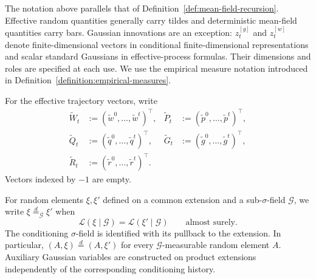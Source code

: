 The notation above parallels that of
Definition~\ref{def:mean-field-recursion}.
Effective random quantities generally carry tildes and
deterministic mean-field quantities carry bars.
Gaussian innovations are an exception: $z_t^{[g]}$ and
$z_t^{[w]}$ denote finite-dimensional vectors in conditional
finite-dimensional representations and scalar standard
Gaussians in effective-process formulas.
Their dimensions and roles are specified at each use.
We use the empirical measure notation introduced in
Definition~\ref{definition:empirical-measures}.

For the effective trajectory vectors, write
\[
\begin{aligned}
    \tilde W_t&:=(\tilde w^0,\ldots,\tilde w^t)^\top,
    &\tilde P_t&:=(\tilde p^0,\ldots,\tilde p^t)^\top,\\
    \tilde Q_t&:=(\tilde q^0,\ldots,\tilde q^t)^\top,
    &\tilde G_t&:=(\tilde g^0,\ldots,\tilde g^t)^\top,\\
    \tilde R_t&:=(\tilde r^0,\ldots,\tilde r^t)^\top.
\end{aligned}
\]
Vectors indexed by $-1$ are empty.

For random elements $\xi,\xi'$ defined on a common extension
and a sub-$\sigma$-field $\mathcal G$, we write
$\xi\stackrel d=_{\mathcal G}\xi'$ when
\[
    \mathscr L(\xi\mid\mathcal G)
    =
    \mathscr L(\xi'\mid\mathcal G)
    \qquad\text{almost surely}.
\]
The conditioning $\sigma$-field is identified with its pullback
to the extension. In particular,
$(A,\xi)\stackrel d=(A,\xi')$ for every
$\mathcal G$-measurable random element $A$.
Auxiliary Gaussian variables are constructed on product
extensions independently of the corresponding conditioning
history.

